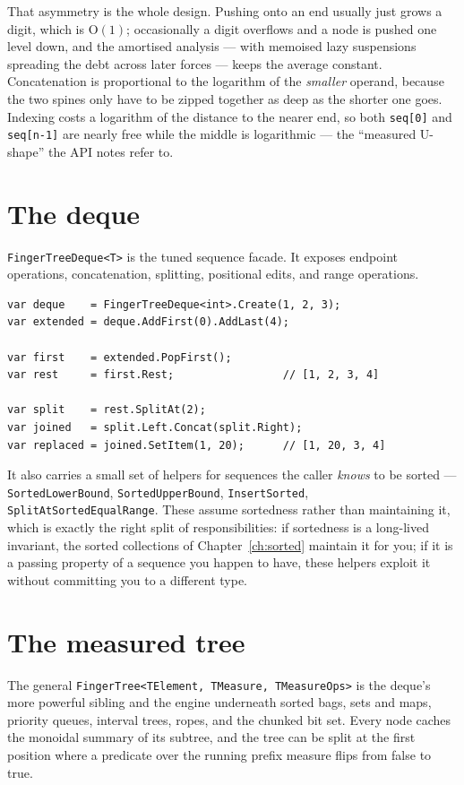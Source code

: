 \documentclass[11pt,twoside,openright]{book}
\newcommand{\code}[1]{\texorpdfstring{\textcolor{d7ink}{\texttt{#1}}}{#1}}
\newcommand{\bigoh}[1]{$\mathrm{O}(#1)$}
\begin{document}
That asymmetry is the whole design. Pushing onto an end usually just grows a
digit, which is \bigoh{1}; occasionally a digit overflows and a node is pushed
one level down, and the amortised analysis --- with memoised lazy suspensions
spreading the debt across later forces --- keeps the average constant.
Concatenation is proportional to the logarithm of the \emph{smaller} operand,
because the two spines only have to be zipped together as deep as the shorter
one goes. Indexing costs a logarithm of the distance to the nearer end, so both
\code{seq[0]} and \code{seq[n-1]} are nearly free while the middle is
logarithmic --- the ``measured U-shape'' the API notes refer to.

\section{The deque}

\code{FingerTreeDeque<T>} is the tuned sequence facade. It exposes endpoint
operations, concatenation, splitting, positional edits, and range operations.

\begin{lstlisting}[language={[Sharp]C}]
var deque    = FingerTreeDeque<int>.Create(1, 2, 3);
var extended = deque.AddFirst(0).AddLast(4);

var first    = extended.PopFirst();
var rest     = first.Rest;                 // [1, 2, 3, 4]

var split    = rest.SplitAt(2);
var joined   = split.Left.Concat(split.Right);
var replaced = joined.SetItem(1, 20);      // [1, 20, 3, 4]
\end{lstlisting}

It also carries a small set of helpers for sequences the caller \emph{knows} to
be sorted --- \code{SortedLowerBound}, \code{SortedUpperBound},
\code{InsertSorted}, \code{SplitAtSortedEqualRange}. These assume sortedness
rather than maintaining it, which is exactly the right split of
responsibilities: if sortedness is a long-lived invariant, the sorted
collections of Chapter~\ref{ch:sorted} maintain it for you; if it is a passing
property of a sequence you happen to have, these helpers exploit it without
committing you to a different type.

\section{The measured tree}

The general \code{FingerTree<TElement, TMeasure, TMeasureOps>} is the deque's
more powerful sibling and the engine underneath sorted bags, sets and maps,
priority queues, interval trees, ropes, and the chunked bit set. Every node
caches the monoidal summary of its subtree, and the tree can be split at the
first position where a predicate over the running prefix measure flips from
false to true.
\end{document}
